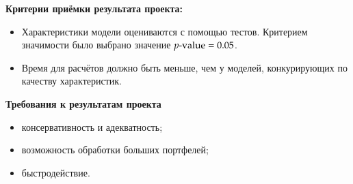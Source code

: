 \textbf{Критерии приёмки результата проекта:}
\begin{itemize}
    \item Характеристики модели оцениваются с помощью тестов. Критерием значимости было выбрано значение $\text{\emph{p}-value} = 0.05$.
    \item Время для расчётов должно быть меньше, чем у моделей, конкурирующих по качеству характеристик.
\end{itemize}

\textbf{Требования к результатам проекта}
\begin{itemize}
    \item консервативность и адекватность;
    \item возможность обработки больших портфелей;
    \item быстродействие.
\end{itemize}


